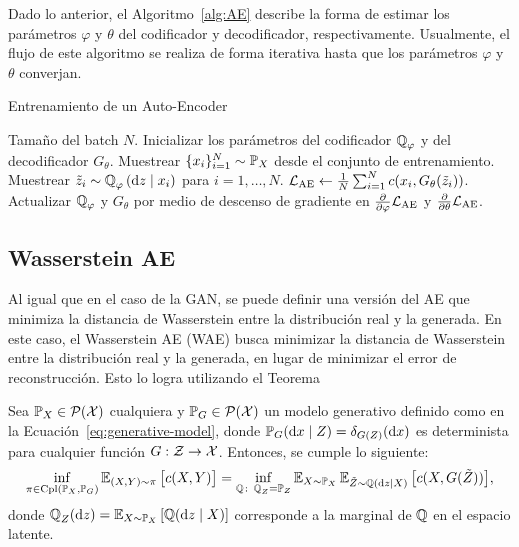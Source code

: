 Dado lo anterior, el Algoritmo~\ref{alg:AE} describe la forma de estimar los parámetros $\varphi$ y $\theta$ del codificador y decodificador, respectivamente. Usualmente, el flujo de este algoritmo se realiza de forma iterativa hasta que los parámetros $\varphi$ y $\theta$ converjan.

\begin{algorithm}[H]
	\caption{Entrenamiento de un Auto-Encoder}\label{alg:AE}
	\begin{algorithmic}[1]
		\Require Tamaño del batch $N$.
		\State Inicializar los parámetros del codificador $\ProbQ_\varphi$ y del decodificador $G_\theta$.
		\State Muestrear $\{x_i\}_{i=1}^{N} \sim \Prob_X$ desde el conjunto de entrenamiento.
		\State Muestrear $\tilde z_i \sim \ProbQ_\varphi \left( \dd z \mid x_i \right)$ para $i=1,\ldots,N$.
		\State $\mathcal{L}_{\mathrm{AE}}\gets \frac{1}{N}\sum_{i=1}^{N} c(x_i, G_\theta(\tilde z_i))$.
		\State Actualizar $\ProbQ_\varphi$ y $G_\theta$ por medio de descenso de gradiente en $\pdv{\varphi} \cL_{\mathrm{AE}}$ y $\pdv{\theta} \mathcal{L}_{\mathrm{AE}}$.
		\EndWhile
	\end{algorithmic}

\end{algorithm}


\subsection{Wasserstein AE}\label{ssec:WAE}  %

Al igual que en el caso de la GAN, se puede definir una versión del AE que minimiza la distancia de Wasserstein entre la distribución real y la generada. En este caso, el Wasserstein AE (WAE) \cite{tolstikhin2017wasserstein} busca minimizar la distancia de Wasserstein entre la distribución real y la generada, en lugar de minimizar el error de reconstrucción. Esto lo logra utilizando el Teorema

\begin{theorem}
	Sea $\Prob_X\in \ProbSpace$ cualquiera y  $\Prob_G\in \ProbSpace$ un modelo generativo definido como en la Ecuación~\eqref{eq:generative-model}, donde $\Prob_G(\dd x \mid Z) = \delta_{G(Z)}(\dd x)$ es determinista para cualquier función $G:\mathcal{Z} \to \mathcal{X}$. Entonces, se cumple lo siguiente:
	\begin{equation}
		\inf_{\pi\in\Cpl(\Prob_X, \Prob_G)} \Exp_{(X, Y)\sim\pi} \qty\big[ c(X, Y) ] = \inf_{\ProbQ \colon \ProbQ_Z = \Prob_Z} \Exp_{X\sim\Prob_X} \Exp_{\tilde Z\sim\ProbQ(\dd z \mid X)} \qty\big[ c(X, G(\tilde Z)) ],
	\end{equation}
	donde $\ProbQ_Z(\dd z) = \Exp_{X\sim \Prob_X} \qty[\ProbQ(\dd z \mid X)]$ corresponde a la marginal de $\ProbQ$ en el espacio latente.
\end{theorem}

